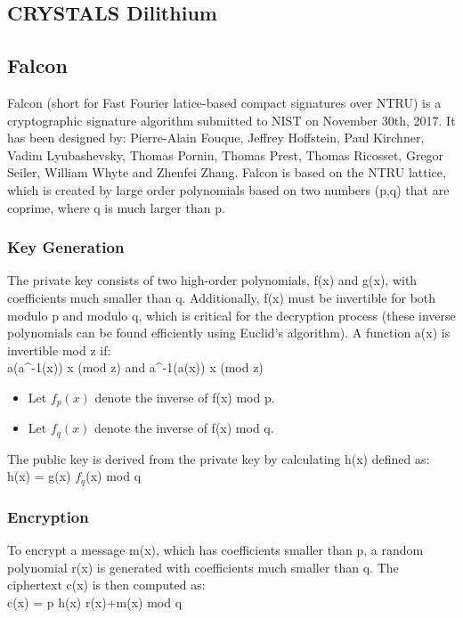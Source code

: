 \documentclass{article}
\begin{document}
\subsection{CRYSTALS Dilithium}
\subsection{Falcon}
Falcon (short for Fast Fourier latice-based compact signatures over NTRU) is a cryptographic signature algorithm submitted to NIST on November 30th, 2017. It has been designed by: Pierre-Alain Fouque, Jeffrey Hoffstein, Paul Kirchner, Vadim Lyubashevsky, Thomas Pornin, Thomas Prest, Thomas Ricosset, Gregor Seiler, William Whyte and Zhenfei Zhang.
\medskip
Falcon is based on the NTRU lattice, which is created by large order polynomials based on two numbers (p,q) that are coprime, where q is much larger than p.

\subsubsection{Key Generation}
The private key consists of two high-order polynomials, f(x) and g(x), with coefficients much smaller than q. Additionally, f(x) must be invertible for both modulo p and modulo q, which is critical for the decryption process (these inverse polynomials can be found efficiently using Euclid's algorithm).
A function a(x) is invertible mod z if:\\
a(a^{-1}(x)) \equiv x (mod z) \quad and \quad a^{-1}(a(x)) \equiv x (mod z)\\
\begin{itemize}
    \item Let $f_{p}(x)$ denote the inverse of f(x) mod p.
    \item Let $f_{q}(x)$ denote the inverse of f(x) mod q.
\end{itemize}
The public key is derived from the private key by calculating h(x) defined as:\\
h(x) = g(x) \cdot $f_{q}$(x) mod q

\subsubsection{Encryption}
To encrypt a message m(x), which has coefficients smaller than p, a random polynomial r(x) is generated with coefficients much smaller than q. The ciphertext c(x) is then computed as:\\
c(x) = p \cdot h(x) \cdot r(x)+m(x) mod q
\end{document}
